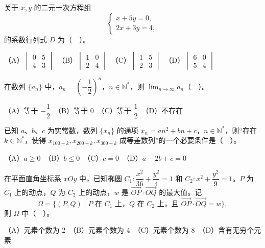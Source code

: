 \begin{question}
关于 $x,y$ 的二元一次方程组
\nopagebreak[4]
\[
\begin{cases}
x+5y=0,\\
2x+3y=4,
\end{cases}
\]
的系数行列式 $D$ 为（　）。

（A）$\begin{vmatrix}0&5\\4&3\end{vmatrix}$　（B）$\begin{vmatrix}1&0\\2&4\end{vmatrix}$　（C）$\begin{vmatrix}1&5\\2&3\end{vmatrix}$　（D）$\begin{vmatrix}6&0\\5&4\end{vmatrix}$

\end{question}
\begin{question}
在数列 $\{a_n\}$ 中，$a_n=\left(-\dfrac12\right)^n$，$n\in\mathbb N^*$，则 $\displaystyle\lim_{n\to\infty}a_n$（　）。

（A）等于 $-\dfrac12$　（B）等于 $0$　（C）等于 $\dfrac12$　（D）不存在

\end{question}
\begin{question}
已知 $a\text{、}b\text{、}c$ 为实常数，数列 $\{x_n\}$ 的通项 $x_n=an^2+bn+c$，$n\in\mathbb N^*$，则“存在 $k\in\mathbb N^*$，使得 $x_{100+k},x_{200+k},x_{300+k}$ 成等差数列”的一个必要条件是（　）。

（A）$a\geqslant0$　（B）$b\leqslant0$　（C）$c=0$　（D）$a-2b+c=0$

\end{question}
\begin{question}
在平面直角坐标系 $xOy$ 中，已知椭圆 $C_1:\dfrac{x^2}{36}+\dfrac{y^2}{4}=1$ 和 $C_2:x^2+\dfrac{y^2}{9}=1$。$P$ 为 $C_1$ 上的动点，$Q$ 为 $C_2$ 上的动点，$w$ 是 $\overrightarrow{OP}\cdot\overrightarrow{OQ}$ 的最大值。记
\nopagebreak[4]
\[
\Omega=\{(P,Q)\mid P\text{ 在 }C_1\text{ 上，}Q\text{ 在 }C_2\text{ 上，且 }\overrightarrow{OP}\cdot\overrightarrow{OQ}=w\},
\]
则 $\Omega$ 中（　）。

（A）元素个数为 2　（B）元素个数为 4　（C）元素个数为 8　（D）含有无穷个元素

\end{question}

